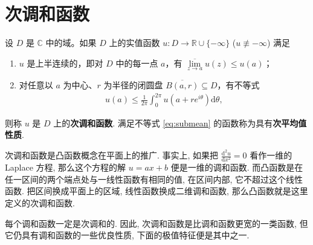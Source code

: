 \documentclass[../../main.tex]{subfiles}%
\begin{document}
\section{次调和函数}

\begin{definition}
设 \(D\) 是 \(\mathbb{C}\) 中的域。如果 \(D\) 上的实值函数 \(u: D \to \mathbb{R} \cup \{-\infty\}\) (\(u \not\equiv -\infty\)) 满足
\begin{enumerate}[(1)]
\item \(u\) 是上半连续的，即对 \(D\) 中的每一点 \(a\)，有 \(\overline{\lim\limits_{z \to a}} u(z) \leqslant u(a)\)；
\item 对任意以 \(a\) 为中心、\(r\) 为半径的闭圆盘 \(\overline{B(a,r)} \subseteq D\)，有不等式
\begin{align}
u(a) \leqslant \frac{1}{2\pi} \int_{0}^{2\pi} u(a+re^{i\theta}) \mathrm{d}\theta,
\label{eq:submean}
\end{align}
\end{enumerate}
则称 \(u\) 是 \(D\) 上的\textbf{次调和函数}. 满足不等式 \eqref{eq:submean} 的函数称为具有\textbf{次平均值性质}.
\end{definition}
\begin{remark}
次调和函数是凸函数概念在平面上的推广. 事实上, 如果把 \(\frac{\mathrm{d}^2 u}{\mathrm{d}x^2} = 0\) 看作一维的 Laplace 方程, 那么这个方程的解 \(u = ax + b\) 便是一维的调和函数. 而凸函数是在任一区间的两个端点处与一线性函数有相同的值, 在区间内部, 它不超过这个线性函数. 把区间换成平面上的区域, 线性函数换成二维调和函数, 那么凸函数就是这里定义的次调和函数.
\end{remark}
\begin{remark}
每个调和函数一定是次调和的. 因此, 次调和函数是比调和函数更宽的一类函数, 但它仍具有调和函数的一些优良性质, 下面的极值特征便是其中之一.
\end{remark}
\end{document}
